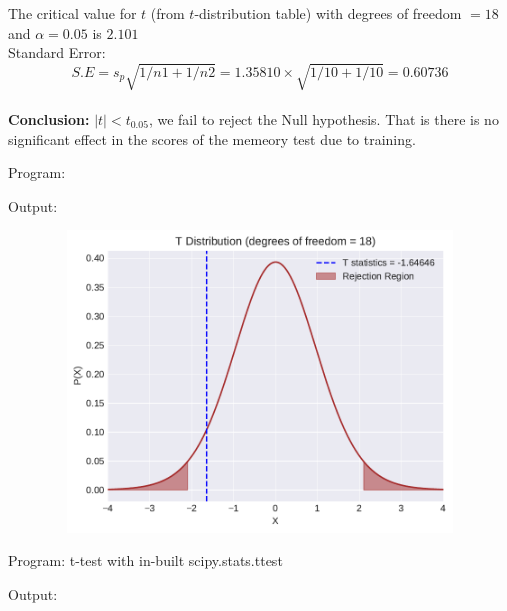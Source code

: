 \documentclass[a4paper,11pt,openright]{report}
\begin{document}
\begin{enumerate}
The critical value for $t$ (from $t$-distribution table) with degrees of freedom $= 18$ and 
$\alpha = 0.05$ is $2.101$ \\

Standard Error:
\begin{equation*}
S.E = s_{p} \sqrt{1/n1 + 1/n2} = 1.35810 \times \sqrt{1/10 + 1/10} = 0.60736
\end{equation*} \\

\textbf{Conclusion:} $|t| < t_{0.05}$, we fail to reject the Null hypothesis. That is there is
no significant effect in the scores of the memeory test due to training.

\pagebreak

Program:


\vspace{1cm}

Output:


\begin{figure}[ht!]
\includegraphics[width=16cm,height=8cm,keepaspectratio]{tscript3.pdf}
\centering
\end{figure}

\vspace{2cm}

Program: t-test with in-built scipy.stats.ttest


\vspace{1cm}

Output:



\end{enumerate}
\end{document}
